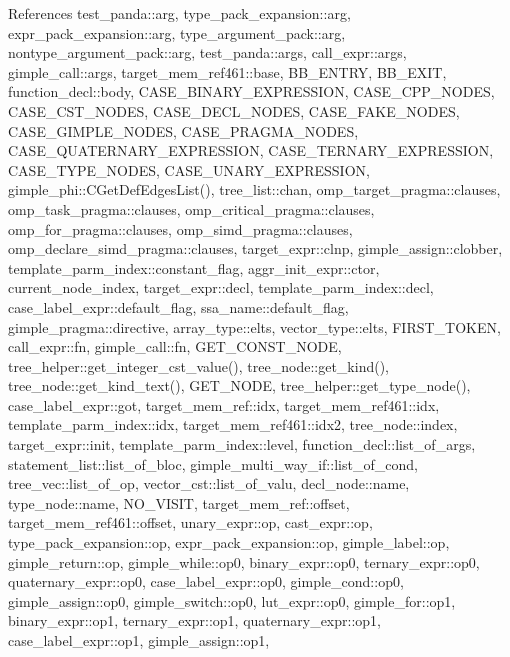 References test\+\_\+panda\+::arg, type\+\_\+pack\+\_\+expansion\+::arg, expr\+\_\+pack\+\_\+expansion\+::arg, type\+\_\+argument\+\_\+pack\+::arg, nontype\+\_\+argument\+\_\+pack\+::arg, test\+\_\+panda\+::args, call\+\_\+expr\+::args, gimple\+\_\+call\+::args, target\+\_\+mem\+\_\+ref461\+::base, B\+B\+\_\+\+E\+N\+T\+RY, B\+B\+\_\+\+E\+X\+IT, function\+\_\+decl\+::body, C\+A\+S\+E\+\_\+\+B\+I\+N\+A\+R\+Y\+\_\+\+E\+X\+P\+R\+E\+S\+S\+I\+ON, C\+A\+S\+E\+\_\+\+C\+P\+P\+\_\+\+N\+O\+D\+ES, C\+A\+S\+E\+\_\+\+C\+S\+T\+\_\+\+N\+O\+D\+ES, C\+A\+S\+E\+\_\+\+D\+E\+C\+L\+\_\+\+N\+O\+D\+ES, C\+A\+S\+E\+\_\+\+F\+A\+K\+E\+\_\+\+N\+O\+D\+ES, C\+A\+S\+E\+\_\+\+G\+I\+M\+P\+L\+E\+\_\+\+N\+O\+D\+ES, C\+A\+S\+E\+\_\+\+P\+R\+A\+G\+M\+A\+\_\+\+N\+O\+D\+ES, C\+A\+S\+E\+\_\+\+Q\+U\+A\+T\+E\+R\+N\+A\+R\+Y\+\_\+\+E\+X\+P\+R\+E\+S\+S\+I\+ON, C\+A\+S\+E\+\_\+\+T\+E\+R\+N\+A\+R\+Y\+\_\+\+E\+X\+P\+R\+E\+S\+S\+I\+ON, C\+A\+S\+E\+\_\+\+T\+Y\+P\+E\+\_\+\+N\+O\+D\+ES, C\+A\+S\+E\+\_\+\+U\+N\+A\+R\+Y\+\_\+\+E\+X\+P\+R\+E\+S\+S\+I\+ON, gimple\+\_\+phi\+::\+C\+Get\+Def\+Edges\+List(), tree\+\_\+list\+::chan, omp\+\_\+target\+\_\+pragma\+::clauses, omp\+\_\+task\+\_\+pragma\+::clauses, omp\+\_\+critical\+\_\+pragma\+::clauses, omp\+\_\+for\+\_\+pragma\+::clauses, omp\+\_\+simd\+\_\+pragma\+::clauses, omp\+\_\+declare\+\_\+simd\+\_\+pragma\+::clauses, target\+\_\+expr\+::clnp, gimple\+\_\+assign\+::clobber, template\+\_\+parm\+\_\+index\+::constant\+\_\+flag, aggr\+\_\+init\+\_\+expr\+::ctor, current\+\_\+node\+\_\+index, target\+\_\+expr\+::decl, template\+\_\+parm\+\_\+index\+::decl, case\+\_\+label\+\_\+expr\+::default\+\_\+flag, ssa\+\_\+name\+::default\+\_\+flag, gimple\+\_\+pragma\+::directive, array\+\_\+type\+::elts, vector\+\_\+type\+::elts, F\+I\+R\+S\+T\+\_\+\+T\+O\+K\+EN, call\+\_\+expr\+::fn, gimple\+\_\+call\+::fn, G\+E\+T\+\_\+\+C\+O\+N\+S\+T\+\_\+\+N\+O\+DE, tree\+\_\+helper\+::get\+\_\+integer\+\_\+cst\+\_\+value(), tree\+\_\+node\+::get\+\_\+kind(), tree\+\_\+node\+::get\+\_\+kind\+\_\+text(), G\+E\+T\+\_\+\+N\+O\+DE, tree\+\_\+helper\+::get\+\_\+type\+\_\+node(), case\+\_\+label\+\_\+expr\+::got, target\+\_\+mem\+\_\+ref\+::idx, target\+\_\+mem\+\_\+ref461\+::idx, template\+\_\+parm\+\_\+index\+::idx, target\+\_\+mem\+\_\+ref461\+::idx2, tree\+\_\+node\+::index, target\+\_\+expr\+::init, template\+\_\+parm\+\_\+index\+::level, function\+\_\+decl\+::list\+\_\+of\+\_\+args, statement\+\_\+list\+::list\+\_\+of\+\_\+bloc, gimple\+\_\+multi\+\_\+way\+\_\+if\+::list\+\_\+of\+\_\+cond, tree\+\_\+vec\+::list\+\_\+of\+\_\+op, vector\+\_\+cst\+::list\+\_\+of\+\_\+valu, decl\+\_\+node\+::name, type\+\_\+node\+::name, N\+O\+\_\+\+V\+I\+S\+IT, target\+\_\+mem\+\_\+ref\+::offset, target\+\_\+mem\+\_\+ref461\+::offset, unary\+\_\+expr\+::op, cast\+\_\+expr\+::op, type\+\_\+pack\+\_\+expansion\+::op, expr\+\_\+pack\+\_\+expansion\+::op, gimple\+\_\+label\+::op, gimple\+\_\+return\+::op, gimple\+\_\+while\+::op0, binary\+\_\+expr\+::op0, ternary\+\_\+expr\+::op0, quaternary\+\_\+expr\+::op0, case\+\_\+label\+\_\+expr\+::op0, gimple\+\_\+cond\+::op0, gimple\+\_\+assign\+::op0, gimple\+\_\+switch\+::op0, lut\+\_\+expr\+::op0, gimple\+\_\+for\+::op1, binary\+\_\+expr\+::op1, ternary\+\_\+expr\+::op1, quaternary\+\_\+expr\+::op1, case\+\_\+label\+\_\+expr\+::op1, gimple\+\_\+assign\+::op1, 
